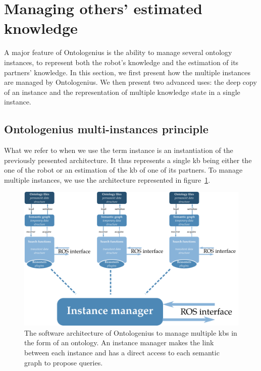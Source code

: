 \section{Managing others' estimated knowledge}

A major feature of Ontologenius is the ability to manage several ontology instances, to represent both the robot's knowledge and the estimation of its partners' knowledge. In this section, we first present how the multiple instances are managed by Ontologenius. We then present two advanced uses: the deep copy of an instance and the representation of multiple knowledge state in a single instance.

\subsection{Ontologenius multi-instances principle}

What we refer to when we use the term instance is an instantiation of the previously presented architecture. It thus represents a single \acrlong{kb} being either the one of the robot or an estimation of the \acrlong{kb} of one of its partners. To manage multiple instances, we use the architecture represented in figure~\ref{fig:chap2_archi_multi}.

\begin{figure}[ht!]
\centering
\includegraphics[width=\textwidth]{figures/chapter2/archi_multi.png}
\caption{\label{fig:chap2_archi_multi} The software architecture of Ontologenius to manage multiple \acrlong{kb}s in the form of an ontology. An instance manager makes the link between each instance and has a direct access to each semantic graph to propose queries. }
\end{figure}

